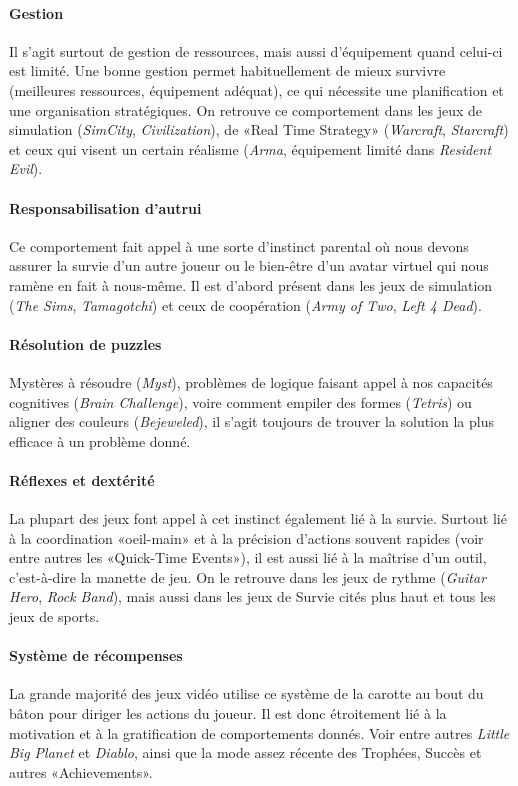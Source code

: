 		\paragraph{Gestion \\ \quad}
Il s’agit surtout de gestion de ressources, mais aussi d’équipement quand celui-ci est limité. Une bonne gestion permet habituellement de mieux survivre (meilleures ressources, équipement adéquat), ce qui nécessite une planification et une organisation stratégiques. On retrouve ce comportement dans les jeux de simulation (\emph{SimCity}, \emph{Civilization}), de «Real Time Strategy» (\emph{Warcraft}, \emph{Starcraft}) et ceux qui visent un certain réalisme (\emph{Arma}, équipement limité dans \emph{Resident Evil}).
		\paragraph{Responsabilisation d’autrui \\ \quad}
Ce comportement fait appel à une sorte d’instinct parental où nous devons assurer la survie d’un autre joueur ou le bien-être d’un avatar virtuel qui nous ramène en fait à nous-même. Il est d’abord présent dans les jeux de simulation (\emph{The Sims}, \emph{Tamagotchi}) et ceux de coopération (\emph{Army of Two}, \emph{Left 4 Dead}).
		\paragraph{Résolution de puzzles \\ \quad}
Mystères à résoudre (\emph{Myst}), problèmes de logique faisant appel à nos capacités cognitives (\emph{Brain Challenge}), voire comment empiler des formes (\emph{Tetris}) ou aligner des couleurs (\emph{Bejeweled}), il s’agit toujours de trouver la solution la plus efficace à un problème donné.
		\paragraph{Réflexes et dextérité \\ \quad}
La plupart des jeux font appel à cet instinct également lié à la survie.
Surtout lié à la coordination «oeil-main» et à la précision d’actions souvent rapides (voir entre autres les «Quick-Time Events»), il est aussi lié à la maîtrise d’un outil, c’est-à-dire la manette de jeu. On le retrouve dans les jeux de rythme (\emph{Guitar Hero}, \emph{Rock Band}), mais aussi dans les jeux de Survie cités plus haut et tous les jeux de sports.
		\paragraph{Système de récompenses \\ \quad}
La grande majorité des jeux vidéo utilise ce système de la carotte au bout du bâton pour diriger les actions du joueur. Il est donc étroitement lié à la motivation et à la gratification de comportements donnés. Voir entre autres \emph{Little Big Planet} et \emph{Diablo}, ainsi que la mode assez récente des Trophées, Succès et autres «Achievements».
